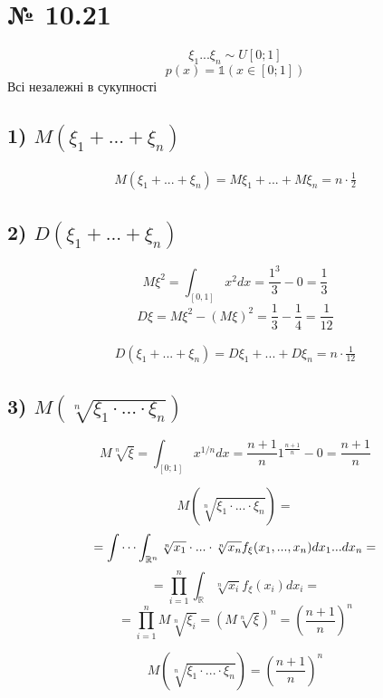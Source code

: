 \documentclass[11pt, a4paper]{article} %
\begin{document}
\section*{№ 10.21}
\begin{mdframed}
    $$\xi_1 ... \xi_n \sim U[0;1]$$
    $$p(x) = \mathbb{1}(x\in[0;1])$$
    Всі незалежні в сукупності
\end{mdframed}

\subsection*{1) $M(\xi_1 + ... + \xi_n)$}
\begin{mdframed}[style=ans]
$$
\begin{gathered}
    M(\xi_1 + ... + \xi_n) = M\xi_1 + ... + M\xi_n = n \cdot \frac{1}{2}
\end{gathered}
$$
\end{mdframed}

\subsection*{2) $D(\xi_1 + ... + \xi_n)$}

$$M\xi^2 = \int_{[0,1]} x^2 dx = \frac{1^3}{3} - 0 = \frac{1}{3}$$
$$D\xi = M\xi^2 - (M\xi)^2 = \frac{1}{3} - \frac{1}{4} = \frac{1}{12}$$
\begin{mdframed}[style=ans]
    $$
    \begin{gathered}
        D(\xi_1 + ... + \xi_n) = D\xi_1 + ... + D\xi_n = n \cdot \frac{1}{12}
    \end{gathered}
    $$
\end{mdframed}


\subsection*{3) $M(\sqrt[n]{\xi_1 \cdot ... \cdot \xi_n})$}

$$M\sqrt[n]{\xi} = \int_{[0;1]} x^{1/n} dx = \frac{n+1}{n} 1^{\frac{n+1}{n}} - 0 = \frac{n+1}{n} $$

$$M(\sqrt[n]{\xi_1 \cdot ... \cdot \xi_n}) = $$
$$= \idotsint_{\mathbb{R}^n} \sqrt[n]{x_1} \cdot ... \cdot \sqrt[n]{x_n} f_\xi(x_1, ..., x_n) dx_1 ... dx_n = $$
$$= \prod_{i=1}^n \int_{\mathbb R} \sqrt[n]{x_i} f_\xi (x_i) dx_i = $$
$$= \prod_{i=1}^n M\sqrt[n]{\xi_i} = (M\sqrt[n]{\xi})^n = \left(\frac{n+1}{n}\right)^n $$
\begin{mdframed}[style=ans]
    $$M(\sqrt[n]{\xi_1 \cdot ... \cdot \xi_n}) = \left(\frac{n+1}{n}\right)^n$$
\end{mdframed}
\end{document}
